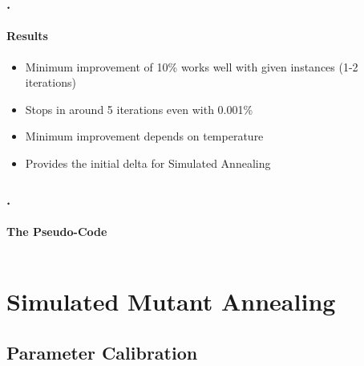 \documentclass{beamer}
\begin{document}
	

\begin{frame}
\frametitle{\thesection.\thesubsection \ \insertsubsection}
\framesubtitle{Results}

\begin{itemize}
	\item Minimum improvement of 10\% works well with given instances (1-2 iterations)
	\item Stops in around 5 iterations even with 0.001\%
	\item Minimum improvement depends on temperature %
	\item Provides the initial delta for Simulated Annealing
\end{itemize}

\end{frame}

\begin{frame}
\frametitle{\thesection.\thesubsection \ \insertsubsection}
\framesubtitle{The Pseudo-Code}
\begin{columns}[onlytextwidth]
\end{columns}
\end{frame}

\section{Simulated Mutant Annealing}

\subsection{Parameter Calibration}
\end{document}
